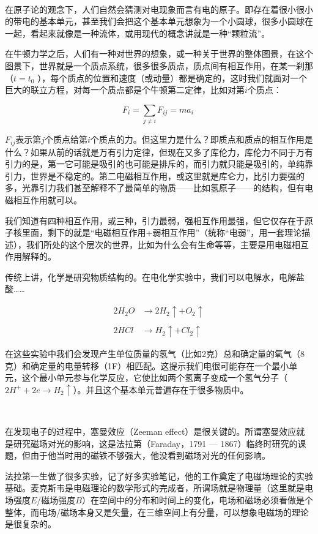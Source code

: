 ~

在原子论的观念下，人们自然会猜测对电现象而言有电的原子。即存在着很小很小的带电的基本单元，甚至我们会把这个基本单元想象为一个小圆球，很多小圆球在一起，看起来就像是一种流体，或用现代的概念讲就是一种“颗粒流”。

在牛顿力学之后，人们有一种对世界的想象，或一种关于世界的整体图景，在这个图景下，世界就是一个质点系统，很多很多质点，质点间有相互作用，在某一刹那（$t = t_0 $ ），每个质点的位置和速度（或动量）都是确定的，这时我们就面对一个巨大的联立方程，对每一个质点都是个牛顿第二定律，比如对第$i$个质点：

\begin{equation}
F_i = \sum\limits_{ j \neq i } F_{ij}    =  m a_i~
\end{equation}

$F_{ij}$表示第$j$个质点给第$i$个质点的力。但这里力是什么？即质点和质点的相互作用是什么？如果从前的话就是万有引力定律，但现在又多了库伦力，库伦力不同于万有引力的是，第一它可能是吸引的也可能是排斥的，而引力就只能是吸引的，单纯靠引力，世界是不稳定的。第二电磁相互作用，或这里就是库仑力，比引力要强的多，光靠引力我们甚至解释不了最简单的物质——比如氢原子——的结构，但有电磁相互作用就可以。

我们知道有四种相互作用，或三种，引力最弱，强相互作用最强，但它仅存在于原子核里面，剩下的就是“电磁相互作用+弱相互作用”（统称“电弱”，用一套理论描述），我们所处的这个层次的世界，比如为什么会有生命等等，主要是用电磁相互作用解释的。

传统上讲，化学是研究物质结构的。在电化学实验中，我们可以电解水，电解盐酸……

\begin{align}
2H_2O &\rightarrow 2H_2 \uparrow + O_2 \uparrow \\\\
2HCl &\rightarrow H_2 \uparrow + Cl_2 \uparrow ~
\end{align}

在这些实验中我们会发现产生单位质量的氢气（比如2克）总和确定量的氧气（8克）和确定量的电量转移（1F）相匹配。这提示我们电很可能存在一个最小单元，这个最小单元参与化学反应，它使比如两个氢离子变成一个氢气分子（$2 H^+ + 2 e \to H_2  \uparrow $）。并且这个基本单元普遍存在于很多物质中。

~

在发现电子的过程中，塞曼效应（Zeeman effect）是很关键的。所谓塞曼效应就是研究磁场对光的影响，这是法拉第（Faraday，1791 — 1867）临终时研究的课题，但由于他当时用的磁铁不够强大，他没看到磁场对光的任何影响。

法拉第一生做了很多实验，记了好多实验笔记，他的工作奠定了电磁场理论的实验基础。麦克斯韦是电磁理论的数学形式的完成者，所谓场就是物理量（这里就是电场强度$E$/磁场强度$B$）在空间中的分布和时间上的变化，电场和磁场必须看做是个整体，而电场/磁场本身又是矢量，在三维空间上有分量，可以想象电磁场的理论是很复杂的。

